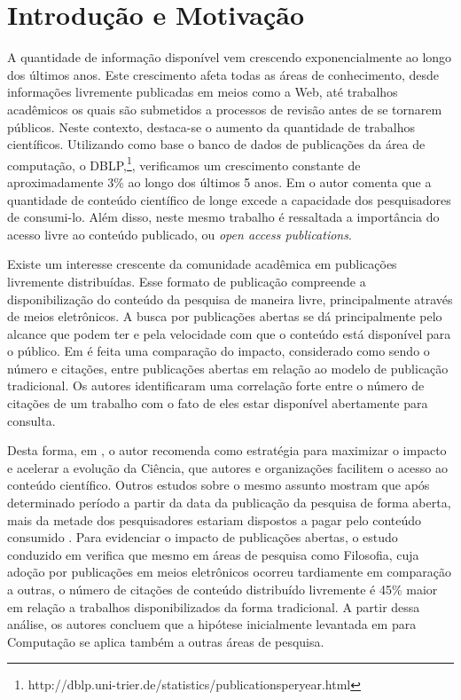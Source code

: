 \chapter{Introdução e Motivação}
A quantidade de informação disponível vem crescendo exponencialmente ao longo dos últimos anos. Este crescimento afeta todas as áreas de conhecimento, desde informações livremente publicadas em meios como a Web, até trabalhos acadêmicos os quais são submetidos a processos de revisão antes de se tornarem públicos. Neste contexto, destaca-se o aumento da quantidade de trabalhos científicos. Utilizando como base o banco de dados de publicações da área de computação, o DBLP,\footnote{http://dblp.uni-trier.de/statistics/publicationsperyear.html}, verificamos um crescimento constante de aproximadamente 3\% ao longo dos últimos 5 anos. Em \cite{Online2001} o autor comenta que a quantidade de conteúdo científico de longe excede a capacidade dos pesquisadores de consumi-lo. Além disso, neste mesmo trabalho é ressaltada a importância do acesso livre ao conteúdo publicado, ou \textit{open access publications}.

Existe um interesse crescente da comunidade acadêmica em publicações livremente distribuídas. Esse formato de publicação compreende a disponibilização do conteúdo da pesquisa de maneira livre, principalmente através de meios eletrônicos. A busca por publicações abertas se dá principalmente pelo alcance que podem ter e pela velocidade com que o conteúdo está disponível para o público. Em \cite{Comparing2004} é feita uma comparação do impacto, considerado como sendo o número e citações, entre publicações abertas em relação ao modelo de publicação tradicional. Os autores identificaram uma correlação forte entre o número de citações de um trabalho com o fato de eles estar disponível abertamente para consulta.

Desta forma, em \cite{Online2001}, o autor recomenda como estratégia para maximizar o impacto e acelerar a evolução da Ciência, que autores e organizações facilitem o acesso ao conteúdo científico. Outros estudos sobre o mesmo assunto mostram que após determinado período a partir da data da publicação da pesquisa de forma aberta, mais da metade dos pesquisadores estariam dispostos a pagar pelo conteúdo consumido \cite{Societies2002Misc}. Para evidenciar o impacto de publicações abertas, o estudo conduzido em \cite{OpenAccessImpact2004} verifica que mesmo em áreas de pesquisa como Filosofia, cuja adoção por publicações em meios eletrônicos ocorreu tardiamente em comparação a outras, o número de citações de conteúdo distribuído livremente é 45\% maior em relação a trabalhos disponibilizados da forma tradicional. A partir dessa análise, os autores concluem que a hipótese inicialmente levantada em \cite{Online2001} para Computação se aplica também a outras áreas de pesquisa.

